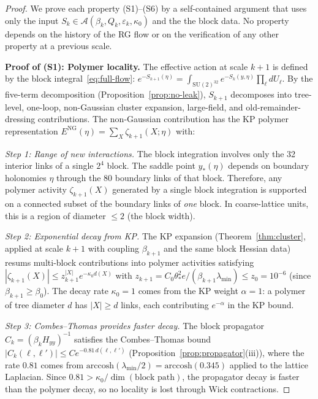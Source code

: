 \documentclass[11pt]{article}
\theoremstyle{definition}
\newcommand{\SU}{\mathrm{SU}}
\begin{document}
\begin{proof}
We prove each property (S1)--(S6) by a self-contained argument
that uses only the input $S_k\in\mathcal{A}(\beta_k,Q_k,
\varepsilon_k,\kappa_0)$ and the the block data.
No property depends on the history of the RG flow or on
the verification of any other property at a previous scale.

\medskip\noindent\textbf{Proof of (S1): Polymer locality.}
The effective action at scale $k{+}1$ is defined by the
block integral~\eqref{eq:full-flow}:
$e^{-S_{k+1}(\eta)}=\int_{\SU(2)^{32}}
e^{-S_k(y,\eta)}\prod_\ell dU_\ell$.
By the five-term decomposition (Proposition~\ref{prop:no-leak}),
$S_{k+1}$ decomposes into tree-level, one-loop, non-Gaussian
cluster expansion, large-field, and old-remainder-dressing
contributions.  The non-Gaussian contribution has the KP
polymer representation $E^{\mathrm{NG}}(\eta)
=\sum_X\zeta_{k+1}(X;\eta)$ with:

\emph{Step 1: Range of new interactions.}
The block integration involves only the 32 interior links of
a single $2^4$ block.  The saddle point $y_*(\eta)$ depends
on boundary holonomies $\eta$ through the 80 boundary links of
that block.  Therefore, any polymer activity $\zeta_{k+1}(X)$
generated by a single block integration is supported on a
connected subset of the boundary links of \emph{one} block.
In coarse-lattice units, this is a region of diameter $\le 2$
(the block width).

\emph{Step 2: Exponential decay from KP.}
The KP expansion (Theorem~\ref{thm:cluster}, applied at
scale $k{+}1$ with coupling $\beta_{k+1}$ and the same
block Hessian data) resums multi-block contributions into
polymer activities satisfying
$|\zeta_{k+1}(X)|\le z_{k+1}^{|X|} e^{-\kappa_0 d(X)}$
with $z_{k+1}=C_0\theta_*^2 e/(\beta_{k+1}\lambda_{\min})
\le z_0=10^{-6}$ (since $\beta_{k+1}\ge\beta_0$).
The decay rate $\kappa_0=1$ comes from the KP weight
$\alpha=1$: a polymer of tree diameter $d$ has $|X|\ge d$
links, each contributing $e^{-\alpha}$ in the KP bound.

\emph{Step 3: Combes--Thomas provides faster decay.}
The block propagator $C_k=(\beta_k H_{yy})^{-1}$ satisfies
the Combes--Thomas bound
$|C_k(\ell,\ell')|\le C e^{-0.81\,d(\ell,\ell')}$
(Proposition~\ref{prop:propagator}(iii)), where the rate
$0.81$ comes from
$\mathrm{arccosh}(\lambda_{\min}/2)=\mathrm{arccosh}(0.345)$
applied to the lattice Laplacian.  Since
$0.81>\kappa_0/\dim(\text{block path})$, the propagator
decay is faster than the polymer decay, so no locality is
lost through Wick contractions.


\end{proof}
\end{document}
